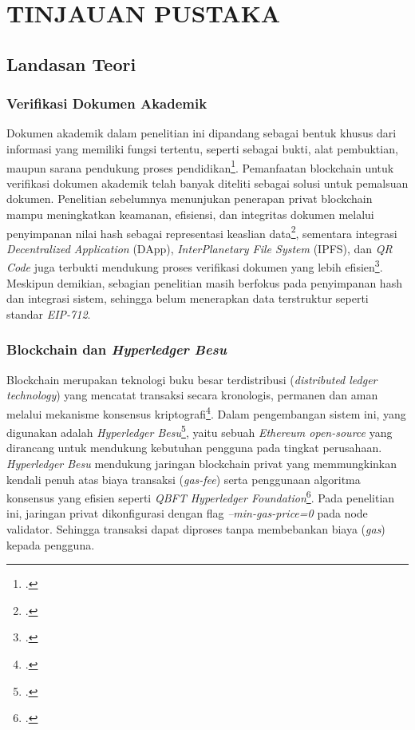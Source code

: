\chapter{TINJAUAN PUSTAKA}
	\section{Landasan Teori}
		\subsection{Verifikasi Dokumen Akademik}
		\setlength{\leftskip}{1.4cm}
		Dokumen akademik dalam penelitian ini dipandang sebagai bentuk khusus dari informasi yang memiliki fungsi tertentu, seperti sebagai bukti, alat pembuktian, maupun sarana pendukung proses pendidikan\footcite{Stolyarov2021}. Pemanfaatan blockchain untuk verifikasi dokumen akademik telah banyak diteliti sebagai solusi untuk pemalsuan dokumen. Penelitian sebelumnya menunjukan penerapan privat blockchain mampu meningkatkan keamanan, efisiensi, dan integritas dokumen melalui penyimpanan nilai hash sebagai representasi keaslian data\footcite{KumarK2020}, sementara integrasi \textit{Decentralized Application}  (DApp), \textit{InterPlanetary File System} (IPFS), dan \textit{QR Code} juga terbukti mendukung proses verifikasi dokumen yang lebih efisien\footcite{Gangwar2024}. Meskipun
		demikian, sebagian penelitian masih berfokus pada penyimpanan hash dan integrasi sistem, sehingga belum menerapkan data terstruktur seperti standar \textit{EIP-712}.


		\subsection{Blockchain dan \textit{Hyperledger Besu}}
		Blockchain merupakan teknologi buku besar terdistribusi (\textit{distributed ledger technology}) yang mencatat transaksi secara kronologis, permanen dan aman melalui mekanisme konsensus kriptografi\footcite{Zheng2017}. Dalam pengembangan sistem ini, yang digunakan adalah  \textit{Hyperledger Besu}\footcite{HyperledgerFoundation}, yaitu sebuah \textit{Ethereum open-source} yang dirancang untuk mendukung kebutuhan pengguna pada tingkat perusahaan.  \textit{Hyperledger Besu} mendukung jaringan blockchain privat  yang memmungkinkan kendali penuh atas biaya transaksi (\textit{gas-fee}) serta penggunaan algoritma konsensus yang efisien seperti \textit{QBFT Hyperledger Foundation}\footcite{HyperledgerFoundation}. Pada penelitian ini, jaringan privat dikonfigurasi dengan flag \textit{--min-gas-price=0} pada node validator. Sehingga transaksi dapat diproses tanpa membebankan biaya (\textit{gas}) kepada pengguna. 

